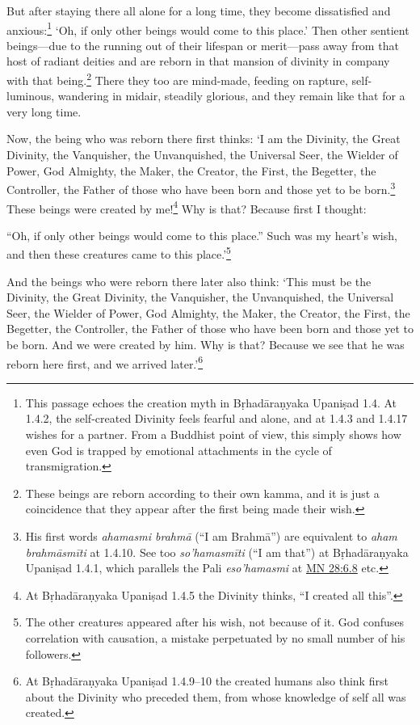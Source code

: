\documentclass[12pt,openany]{book}%
\begin{document}
But after staying there all alone for a long time, they become dissatisfied and anxious:\footnote{This passage echoes the creation myth in \textsanskrit{Bṛhadāraṇyaka} \textsanskrit{Upaniṣad} 1.4. At 1.4.2, the self-created Divinity feels fearful and alone, and at 1.4.3 and 1.4.17 wishes for a partner. From a Buddhist point of view, this simply shows how even God is trapped by emotional attachments in the cycle of transmigration. } ‘Oh, if only other beings would come to this place.’ Then other sentient beings—due to the running out of their lifespan or merit—pass away from that host of radiant deities and are reborn in that mansion of divinity in company with that being.\footnote{These beings are reborn according to their own kamma, and it is just a coincidence that they appear after the first being made their wish. } There they too are mind-made, feeding on rapture, self-luminous, wandering in midair, steadily glorious, and they remain like that for a very long time. 

Now, the being who was reborn there first thinks: ‘I am the Divinity, the Great Divinity, the Vanquisher, the Unvanquished, the Universal Seer, the Wielder of Power, God Almighty, the Maker, the Creator, the First, the Begetter, the Controller, the Father of those who have been born and those yet to be born.\footnote{His first words \textit{ahamasmi \textsanskrit{brahmā}} (“I am \textsanskrit{Brahmā}”) are equivalent to \textit{aham \textsanskrit{brahmāsmīti}} at 1.4.10. See too \textit{so’\textsanskrit{hamasmīti}} (“I am that”) at \textsanskrit{Bṛhadāraṇyaka} \textsanskrit{Upaniṣad} 1.4.1, which parallels the Pali \textit{eso’hamasmi} at \href{https://suttacentral.net/mn28/en/sujato\#6.8}{MN 28:6.8} etc. } These beings were created by me!\footnote{At \textsanskrit{Bṛhadāraṇyaka} \textsanskrit{Upaniṣad} 1.4.5 the Divinity thinks, “I created all this”. } Why is that? Because first I thought: 

“Oh, if only other beings would come to this place.” Such was my heart’s wish, and then these creatures came to this place.’\footnote{The other creatures appeared after his wish, not because of it. God confuses correlation with causation, a mistake perpetuated by no small number of his followers. } 

And the beings who were reborn there later also think: ‘This must be the Divinity, the Great Divinity, the Vanquisher, the Unvanquished, the Universal Seer, the Wielder of Power, God Almighty, the Maker, the Creator, the First, the Begetter, the Controller, the Father of those who have been born and those yet to be born. And we were created by him. Why is that? Because we see that he was reborn here first, and we arrived later.’\footnote{At \textsanskrit{Bṛhadāraṇyaka} \textsanskrit{Upaniṣad} 1.4.9–10 the created humans also think first about the Divinity who preceded them, from whose knowledge of self all was created. } 
\end{document}
